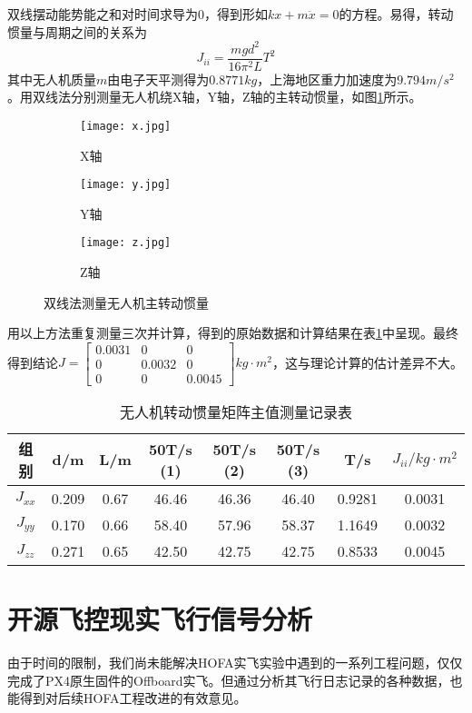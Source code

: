   双线摆动能势能之和对时间求导为$0$，得到形如$kx+m\ddot x=0$的方程。易得，转动惯量与周期之间的关系为
  $$
  J_{ii}=\frac{mgd^2}{16 \pi^2 L} T^2
  $$
其中无人机质量$m$由电子天平测得为$0.8771kg$，上海地区重力加速度为$9.794 m/s^2$。用双线法分别测量无人机绕X轴，Y轴，Z轴的主转动惯量，如图\ref{双线法}所示。
  \begin{figure}[H]
    \centering
    \begin{subfigure}[c]{0.33\textwidth}
      \centering
      \texttt{[image: x.jpg]}  %
      \caption{X轴}
    \end{subfigure}\hfill
    \begin{subfigure}[c]{0.33\textwidth}
      \centering
      \texttt{[image: y.jpg]}  %
      \caption{Y轴}
    \end{subfigure}\hfill
    \begin{subfigure}[c]{0.33\textwidth}
      \centering
      \texttt{[image: z.jpg]}  %
      \caption{Z轴}
    \end{subfigure}
    \caption{双线法测量无人机主转动惯量}
    \label{双线法}
\end{figure}
用以上方法重复测量三次并计算，得到的原始数据和计算结果在表\ref{三次}中呈现。最终得到结论$J=\begin{bmatrix}
  0.0031 &0&0\\
  0&0.0032&0\\
  0&0& 0.0045
\end{bmatrix}kg \cdot m^2$，这与理论计算的估计差异不大。
  \begin{table}[H]
    \centering
    \caption{无人机转动惯量矩阵主值测量记录表}
    \label{三次}
    \begin{tabular}{cccccccc}
        \toprule
        组别&d/m  & L/m & 50T/s (1) & 50T/s (2) &50T/s (3) & T/s & $J_{ii} / kg \cdot m^2$\\
        \midrule
        $J_{xx}$ & 0.209 &0.67 & 46.46 & 46.36 & 46.40 &0.9281 &0.0031\\
        $J_{yy}$ & 0.170 &0.66 & 58.40 & 57.96 & 58.37 &1.1649 &0.0032\\
        $J_{zz}$ & 0.271 & 0.65& 42.50 & 42.75 & 42.75 &0.8533 &0.0045\\
        \bottomrule
    \end{tabular}
\end{table}

\section{开源飞控现实飞行信号分析}
由于时间的限制，我们尚未能解决HOFA实飞实验中遇到的一系列工程问题，仅仅完成了PX4原生固件的Offboard实飞。但通过分析其飞行日志记录的各种数据，也能得到对后续HOFA工程改进的有效意见。


